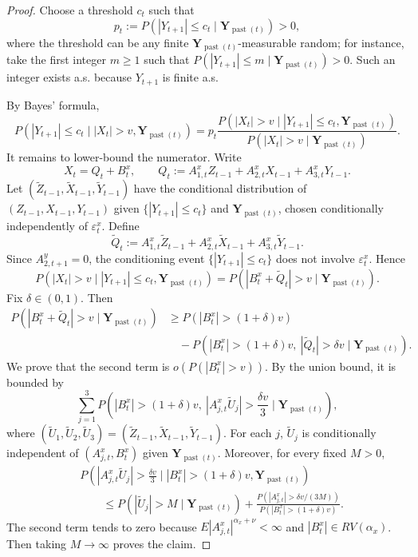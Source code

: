 \documentclass[a4paper,11pt]{article}
\DeclareMathOperator{\past}{past}
\begin{document}
\begin{proof}
Choose a threshold \(c_t\) such that
\[
p_t:=P(|Y_{t+1}|\leq c_t\mid\mathbf Y_{\past(t)})>0,
\]
where the threshold can be any finite \(\mathbf Y_{\past(t)}\)-measurable random; for instance, take the first integer \(m\geq1\) such that \(P(|Y_{t+1}|\leq m\mid\mathbf Y_{\past(t)})>0\). Such an integer exists a.s. because \(Y_{t+1}\) is finite a.s.

By Bayes' formula,
\[
P(|Y_{t+1}|\leq c_t\mid |X_t|>v,\mathbf Y_{\past(t)})
=
p_t
\frac{
P(|X_t|>v\mid |Y_{t+1}|\leq c_t,\mathbf Y_{\past(t)})
}{
P(|X_t|>v\mid\mathbf Y_{\past(t)})
}.
\]
It remains to lower-bound the numerator. Write
\[
X_t=Q_t+B^x_t,
\qquad
Q_t:=A^x_{1,t}Z_{t-1}+A^x_{2,t}X_{t-1}+A^x_{3,t}Y_{t-1}.
\]
Let
\((\widetilde Z_{t-1},\widetilde X_{t-1},\widetilde Y_{t-1})\) have the
conditional distribution of
\((Z_{t-1},X_{t-1},Y_{t-1})\) given
\(\{|Y_{t+1}|\leq c_t\}\) and \(\mathbf Y_{\past(t)}\), chosen conditionally
independently of \(\varepsilon^x_t\). Define
\[
\widetilde Q_t
:=
A^x_{1,t}\widetilde Z_{t-1}
+
A^x_{2,t}\widetilde X_{t-1}
+
A^x_{3,t}\widetilde Y_{t-1}.
\]
Since \(A^y_{2,t+1}=0\), the conditioning event
\(\{|Y_{t+1}|\leq c_t\}\) does not involve \(\varepsilon^x_t\). Hence
\[
P(|X_t|>v\mid |Y_{t+1}|\leq c_t,\mathbf Y_{\past(t)})
=
P(|B^x_t+\widetilde Q_t|>v\mid\mathbf Y_{\past(t)}).
\]
Fix \(\delta\in(0,1)\). Then
\[
\begin{aligned}
P(|B^x_t+\widetilde Q_t|>v\mid\mathbf Y_{\past(t)})
&\geq
P(|B^x_t|>(1+\delta)v) \\
&\quad -
P(|B^x_t|>(1+\delta)v,\ |\widetilde Q_t|>\delta v
\mid\mathbf Y_{\past(t)}).
\end{aligned}
\]
We prove that the second term is \(o(P(|B^x_t|>v))\). By the union bound, it is
bounded by
\[
\sum_{j=1}^3
P\left(
|B^x_t|>(1+\delta)v,\
|A^x_{j,t}\widetilde U_j|>\frac{\delta v}{3}
\mid\mathbf Y_{\past(t)}
\right),
\]
where
\(
(\widetilde U_1,\widetilde U_2,\widetilde U_3)
=
(\widetilde Z_{t-1},\widetilde X_{t-1},\widetilde Y_{t-1}).
\)
For each \(j\), \(\widetilde U_j\) is conditionally independent of
\((A^x_{j,t},B^x_t)\) given \(\mathbf Y_{\past(t)}\). Moreover, for every fixed \(M>0\),
\[
\begin{aligned}
&
P\left(
|A^x_{j,t}\widetilde U_j|>\frac{\delta v}{3}
\mid
|B^x_t|>(1+\delta)v,\mathbf Y_{\past(t)}
\right) \\
&\qquad\leq
P(|\widetilde U_j|>M\mid\mathbf Y_{\past(t)})
+
\frac{
P\left(|A^x_{j,t}|>\delta v/(3M)\right)
}{
P\left(|B^x_t|>(1+\delta)v\right)
}.
\end{aligned}
\]
The second term tends to zero because
\(E|A^x_{j,t}|^{\alpha_x+\nu}<\infty\) and
\(|B^x_t|\in RV(\alpha_x)\). Then taking \(M\to\infty\) proves the claim.


\end{proof}
\end{document}
